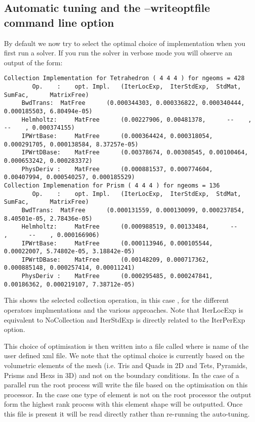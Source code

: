 \subsection{Automatic tuning and the --writeoptfile command line option}
By default we now try to select the optimal choice of implementation
when you first run a solver. If you run the solver in verbose mode you
will observe an output of the form:

\begin{lstlisting}[style=XmlStyle]
Collection Implementation for Tetrahedron ( 4 4 4 ) for ngeoms = 428
	    Op.    :	opt. Impl.	 (IterLocExp,  IterStdExp,  StdMat,     SumFac,      MatrixFree)
	 BwdTrans: 	MatFree   	 (0.000344303, 0.000336822, 0.000340444, 0.000185503, 6.80494e-05)
	 Helmholtz: 	MatFree   	 (0.00227906, 0.00481378,      --    ,      --    , 0.000374155)
	 IPWrtBase: 	MatFree   	 (0.000364424, 0.000318054, 0.000291705, 0.000138584, 8.37257e-05)
	 IPWrtDBase: 	MatFree   	 (0.00378674, 0.00308545, 0.00100464, 0.000653242, 0.000283372)
	 PhysDeriv : 	MatFree   	 (0.000881537, 0.000774604, 0.00407994, 0.000540257, 0.000185529)
Collection Implemenation for Prism ( 4 4 4 ) for ngeoms = 136
	    Op.    :	opt. Impl.	 (IterLocExp,  IterStdExp,  StdMat,     SumFac,      MatrixFree)
	 BwdTrans: 	MatFree   	 (0.000131559, 0.000130099, 0.000237854, 8.40501e-05, 2.78436e-05)
	 Helmholtz: 	MatFree   	 (0.000988519, 0.00133484,      --    ,      --    , 0.000166906)
	 IPWrtBase: 	MatFree   	 (0.000113946, 0.000105544, 0.00022007, 5.74802e-05, 3.18842e-05)
	 IPWrtDBase: 	MatFree   	 (0.00148209, 0.000717362, 0.000885148, 0.000257414, 0.00011241)
	 PhysDeriv : 	MatFree   	 (0.000295485, 0.000247841, 0.00186362, 0.000219107, 7.38712e-05)
\end{lstlisting}


This shows the selected collection operation, in this case
, for the different operators implmentations and the
various approaches. Note that IterLocExp is equivalent to NoCollection
and IterStdExp is directly related to the IterPerExp option.

This choice of optimisation is then written into a file called
 where  is name of the user defined
xml file. We note that the optimal choice is currently based on the
volumetric elements of the mesh (i.e. Tris and Quads in 2D and Tets,
Pyramids, Prisms and Hexs in 3D) and not on the boundary
conditions. In the case of a parallel run the root process will write
the file based on the optimisation on this processor. In the case one
type of element is not on the root processor the output form the
highest rank process with this element shape will be outputted.  Once
this file is present it will be read directly rather than re-running
the auto-tuning. 



